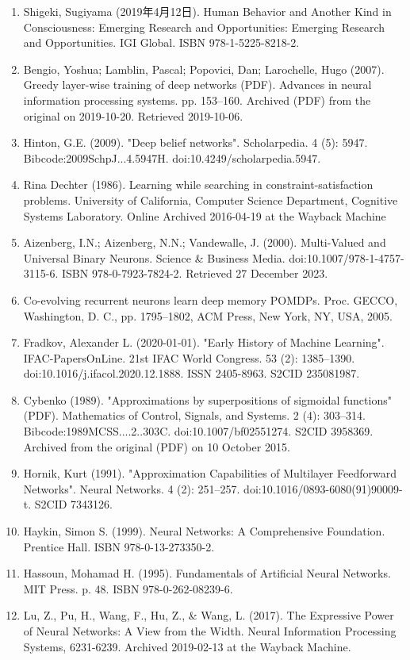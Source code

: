\begin{enumerate}
\item Shigeki, Sugiyama (2019年4月12日). Human Behavior and Another Kind in Consciousness: Emerging Research and Opportunities: Emerging Research and Opportunities. IGI Global. ISBN 978-1-5225-8218-2.  
\item Bengio, Yoshua; Lamblin, Pascal; Popovici, Dan; Larochelle, Hugo (2007). Greedy layer-wise training of deep networks (PDF). Advances in neural information processing systems. pp. 153–160. Archived (PDF) from the original on 2019-10-20. Retrieved 2019-10-06.  
\item Hinton, G.E. (2009). "Deep belief networks". Scholarpedia. 4 (5): 5947. Bibcode:2009SchpJ...4.5947H. doi:10.4249/scholarpedia.5947.  
\item Rina Dechter (1986). Learning while searching in constraint-satisfaction problems. University of California, Computer Science Department, Cognitive Systems Laboratory. Online Archived 2016-04-19 at the Wayback Machine  
\item Aizenberg, I.N.; Aizenberg, N.N.; Vandewalle, J. (2000). Multi-Valued and Universal Binary Neurons. Science & Business Media. doi:10.1007/978-1-4757-3115-6. ISBN 978-0-7923-7824-2. Retrieved 27 December 2023.  
\item Co-evolving recurrent neurons learn deep memory POMDPs. Proc. GECCO, Washington, D. C., pp. 1795–1802, ACM Press, New York, NY, USA, 2005.  
\item Fradkov, Alexander L. (2020-01-01). "Early History of Machine Learning". IFAC-PapersOnLine. 21st IFAC World Congress. 53 (2): 1385–1390. doi:10.1016/j.ifacol.2020.12.1888. ISSN 2405-8963. S2CID 235081987.  
\item Cybenko (1989). "Approximations by superpositions of sigmoidal functions" (PDF). Mathematics of Control, Signals, and Systems. 2 (4): 303–314. Bibcode:1989MCSS....2..303C. doi:10.1007/bf02551274. S2CID 3958369. Archived from the original (PDF) on 10 October 2015.  
\item Hornik, Kurt (1991). "Approximation Capabilities of Multilayer Feedforward Networks". Neural Networks. 4 (2): 251–257. doi:10.1016/0893-6080(91)90009-t. S2CID 7343126.  
\item Haykin, Simon S. (1999). Neural Networks: A Comprehensive Foundation. Prentice Hall. ISBN 978-0-13-273350-2.  
\item Hassoun, Mohamad H. (1995). Fundamentals of Artificial Neural Networks. MIT Press. p. 48. ISBN 978-0-262-08239-6.  
\item Lu, Z., Pu, H., Wang, F., Hu, Z., & Wang, L. (2017). The Expressive Power of Neural Networks: A View from the Width. Neural Information Processing Systems, 6231-6239. Archived 2019-02-13 at the Wayback Machine.

\end{enumerate}
